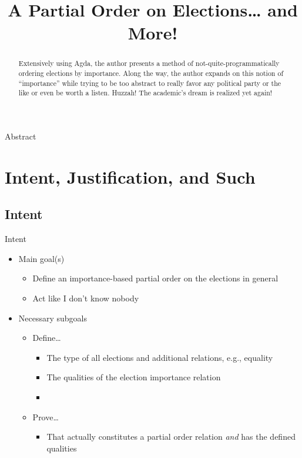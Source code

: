 \documentclass{beamer}
\title{A Partial Order on Elections\ldots{} and More!}
\begin{document}
\maketitle{}

\begin{frame}{Abstract}
\begin{abstract}
Extensively using Agda, the author presents a method of not-quite-programmatically ordering elections by importance.  Along the way, the author expands on this notion of ``importance'' while trying to be too abstract to really favor any political party or the like or even be worth a listen.  Huzzah!  The academic's dream is realized yet again!
\end{abstract}
\end{frame}

\section{Intent, Justification, and Such}

\subsection{Intent}

\begin{frame}{Intent}
\begin{itemize}
  \item Main goal(s)
  \begin{itemize}
    \item Define an importance-based partial order on the elections in general
    \item Act like I don't know nobody
  \end{itemize}
  \item Necessary subgoals
  \begin{itemize}
    \item Define\ldots{}
    \begin{itemize}
      \item The type of all elections and additional relations, e.g., equality
      \item The qualities of the election importance relation 
      \item {}
    \end{itemize}
    \item Prove\ldots{}
    \begin{itemize}
      \item That  actually constitutes a partial order relation \emph{and} has the defined qualities
    \end{itemize}
  \end{itemize}
\end{itemize}
\end{frame}
\end{document}
